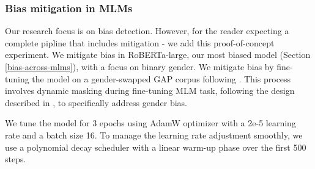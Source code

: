 \subsubsection{Bias mitigation in MLMs}\label{bias-mitigation}

\noindent Our research focus is on bias detection.  However, for the reader expecting a complete pipline that includes mitigation - we add this proof-of-concept experiment.  We mitigate bias in RoBERTa-large, our most biased model (Section \ref{bias-across-mlms}), with a focus on binary gender.
%
We mitigate bias by fine-tuning the model on a gender-swapped GAP corpus \cite{webster-etal-2018-mind} following \citet{bartl-etal-2020-unmasking}. 
% 
This process involves dynamic masking during fine-tuning MLM task, following the design described in \citet{roberta-paper}, to specifically address gender bias.


We tune the model for 3 epochs using AdamW optimizer with a 2e-5 learning rate and a batch size 16. To manage the learning rate adjustment smoothly, we use a polynomial decay scheduler with a linear warm-up phase over the first 500 steps. 


